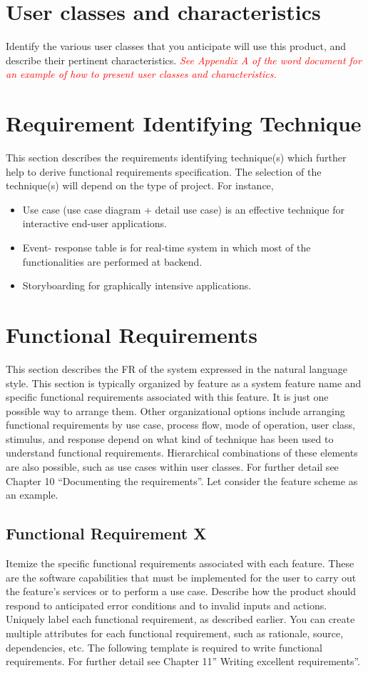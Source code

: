 \documentclass[A4paper,12pt]{report}
\theoremstyle{plain}
\theoremstyle{definition}
\theoremstyle{remark}
\numberwithin{equation}{section}
\begin{document}
\section{User classes and characteristics}
Identify the various user classes that you anticipate will use this product, and describe their pertinent characteristics. \textcolor{red}{\textit{See Appendix A of the word document for an example of how to present user classes and characteristics.}}
\section{Requirement Identifying Technique}
This section describes the requirements identifying technique(s) which further help to derive functional requirements specification. The selection of the technique(s) will depend on the type of project. For instance,

\begin{itemize}
	\item Use case (use case diagram + detail use case) is an effective technique for interactive end-user applications.
	\item Event- response table is for real-time system in which most of the functionalities are performed at backend.
	\item Storyboarding for graphically intensive applications. 
\end{itemize}



\section{Functional Requirements}

This section describes the FR of the system expressed in the natural language style. This section is typically organized by feature as a system feature name and specific functional requirements associated with this feature. It is just one possible way to arrange them. Other organizational options include arranging functional requirements by use case, process flow, mode of operation, user class, stimulus, and response depend on what kind of technique has been used to understand functional requirements. Hierarchical combinations of these elements are also possible, such as use cases within user classes. For further detail see Chapter 10 “Documenting the requirements”. Let consider the feature scheme as an example.


\subsection{Functional Requirement X}
Itemize the specific functional requirements associated with each feature. These are the software capabilities that must be implemented for the user to carry out the feature’s services or to perform a use case. Describe how the product should respond to anticipated error conditions and to invalid inputs and actions. Uniquely label each functional requirement, as described earlier. You can create multiple attributes for each functional requirement, such as rationale, source, dependencies, etc. The following template is required to write functional requirements. For further detail see Chapter 11” Writing excellent requirements”.
\end{document}
